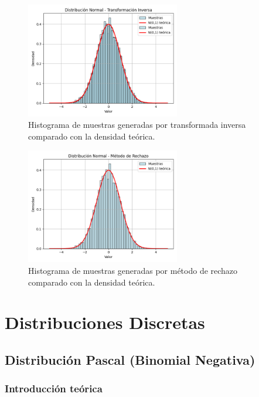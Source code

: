 \documentclass{article}
\begin{document}
\begin{figure}[H]
    \centering
    \includegraphics[width=0.6\textwidth]{visualizaciones/normal_inversa.png}
    \caption{Histograma de muestras generadas por transformada inversa comparado con la densidad teórica.}
    \label{fig:normal_inversa}
\end{figure}

\begin{figure}[H]
    \centering
    \includegraphics[width=0.6\textwidth]{visualizaciones/normal_rechazo.png}
    \caption{Histograma de muestras generadas por método de rechazo comparado con la densidad teórica.}
    \label{fig:normal_rechazo}
\end{figure}



\section{Distribuciones Discretas}

\subsection{Distribución Pascal (Binomial Negativa)}

\subsubsection{Introducción teórica}
\end{document}
